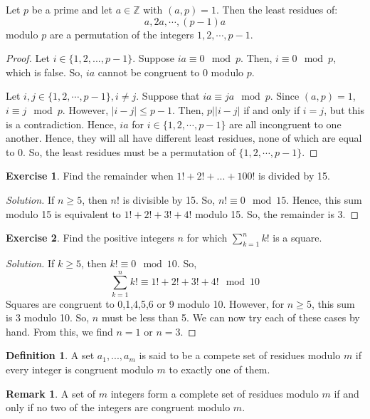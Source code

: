 \documentclass[12pt,letterpaper]{amsbook}
\theoremstyle{definition}
\newtheorem{definition}{Definition} %
\newtheorem*{remark}{Remark}
\newtheorem*{exercise}{Exercise}
\newenvironment{solution}
  {\renewcommand\qedsymbol{$\blacksquare$}\begin{proof}[Solution]}
  {\end{proof}}
\newcommand{\Z}{\mathbb{Z}}
\begin{document}
\begin{lemma}
  Let $p$ be a prime and let $a \in \Z$ with $(a,p) = 1$. Then the least residues of:
  \[a, 2a, \cdots, (p-1)a\]
  modulo $p$ are a permutation of the integers $1,2,\cdots, p-1$.
\end{lemma}
\begin{proof}
  Let $i \in \{1,2,...,p-1\}$. Suppose $ia \equiv 0 \mod p$. Then, $i \equiv 0 \mod p$, which is false. So, $ia$ cannot be congruent to 0 modulo $p$.

  Let $i,j \in \{1,2,\cdots, p-1\}, i \neq j$. Suppose that $ia \equiv ja \mod p$. Since $(a,p) = 1$, $i \equiv j \mod p$. However, $|i-j| \leq p-1$. Then, $p||i-j|$ if and only if $i=j$, but this is a contradiction. Hence, $ia$ for $i \in \{1,2,\cdots, p-1\}$ are all incongruent to one another. Hence, they will all have different least residues, none of which are equal to 0. So, the least residues must be a permutation of $\{1,2, \cdots, p-1\}$.
\end{proof}

\begin{exercise}
  Find the remainder when $1!+2!+...+100!$ is divided by 15.
\end{exercise}
\begin{solution}
  If $n \geq 5$, then $n!$ is divisible by 15. So, $n! \equiv 0 \mod 15$. Hence, this sum modulo 15 is equivalent to $1!+2!+3!+4!$ modulo 15. So, the remainder is 3.
\end{solution}
\begin{exercise}
  Find the positive integers $n$ for which $\sum_{k=1}^n k!$ is a square.
\end{exercise}
\begin{solution}
  If $k \geq 5$, then $k! \equiv 0 \mod 10$. So,
  \[\sum_{k=1}^n k! \equiv 1!+2!+3!+4! \mod 10\]
  Squares are congruent to 0,1,4,5,6 or 9 modulo 10. However, for $n \geq 5$, this sum is 3 modulo 10. So, $n$ must be less than 5. We can now try each of these cases by hand. From this, we find $n=1$ or $n=3$.
\end{solution}

\begin{definition}
  A set $a_1,...,a_m$ is said to be a compete set of residues modulo $m$ if every integer is congruent modulo $m$ to exactly one of them.
\end{definition}

\begin{remark}
  A set of $m$ integers form a complete set of residues modulo $m$ if and only if no two of the integers are congruent modulo $m$.
\end{remark}
\end{document}
